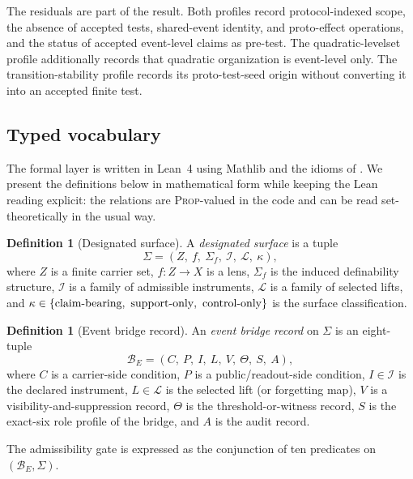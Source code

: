 \documentclass[11pt]{article}
\theoremstyle{definition}
\newtheorem{definition}[theorem]{Definition}
\begin{document}
The residuals are part of the result. Both profiles record protocol-indexed scope, the absence of accepted tests, shared-event identity, and proto-effect operations, and the status of accepted event-level claims as pre-test. The quadratic-levelset profile additionally records that quadratic organization is event-level only. The transition-stability profile records its proto-test-seed origin without converting it into an accepted finite test.

\subsection{Typed vocabulary}
\label{subsec:typed-vocabulary}

The formal layer is written in Lean~4 \citep{deMouraUllrich2021} using Mathlib \citep{Mathlib2020} and the idioms of \citet{Avigad2023Lean}. We present the definitions below in mathematical form while keeping the Lean reading explicit: the relations are \textsc{Prop}-valued in the code and can be read set-theoretically in the usual way.

\begin{definition}[Designated surface]
\label{def:designated-surface}
A \emph{designated surface} is a tuple
\[
  \Sigma = (Z,\ f,\ \Sigma_f,\ \mathcal{I},\ \mathcal{L},\ \kappa),
\]
where $Z$ is a finite carrier set, $f : Z \to X$ is a lens, $\Sigma_f$ is the induced definability structure, $\mathcal{I}$ is a family of admissible instruments, $\mathcal{L}$ is a family of selected lifts, and
$\kappa \in \{\textnormal{claim-bearing},\ \textnormal{support-only},\ \textnormal{control-only}\}$ is the surface classification.
\end{definition}

\begin{definition}[Event bridge record]
\label{def:event-bridge}
An \emph{event bridge record} on $\Sigma$ is an eight-tuple
\[
  \mathcal{B}_E = (C,\ P,\ I,\ L,\ V,\ \Theta,\ S,\ A),
\]
where $C$ is a carrier-side condition, $P$ is a public/readout-side condition, $I \in \mathcal{I}$ is the declared instrument, $L \in \mathcal{L}$ is the selected lift (or forgetting map), $V$ is a visibility-and-suppression record, $\Theta$ is the threshold-or-witness record, $S$ is the exact-six role profile of the bridge, and $A$ is the audit record.
\end{definition}

The admissibility gate is expressed as the conjunction of ten predicates on $(\mathcal{B}_E, \Sigma)$.
\end{document}
